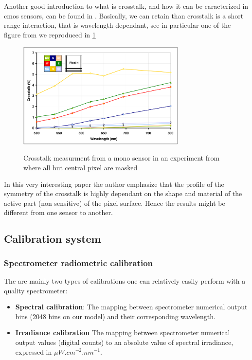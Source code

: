 \documentclass{article}
\begin{document}
     Another good introduction to what is crosstalk, and how it can be caracterized in cmos sensors, can be found in \cite{Estribeau_2005}. Basically, we can retain than crosstalk is a short range interaction, that is wavelength dependant, see in particular one of the figure from \cite{Estribeau_2005} we reproduced in \ref{fig:estribeau_crosstalk_1}
     \begin{figure}[H]
      \centering
      \includegraphics[width=0.75\textwidth]{../../figures/crosstalk_mono_ex1.png}\\
      \caption{Crosstalk measurment from a mono sensor in an experiment from \cite{Estribeau_2005} where all but central pixel are masked}
      \label{fig:estribeau_crosstalk_1}
     \end{figure}
     
     In this very interesting paper the author emphasize that the profile of the symmetry of the crosstalk is highly dependant on the shape and material of the active part (non sensitive) of the pixel surface. Hence the results might be different from one sensor to another.
  
     
    
  \subsection{Calibration system}
    \subsubsection{Spectrometer radiometric calibration}
    The are mainly two types of calibrations one can relatively easily perform with a quality spectrometer:
    \begin{itemize}
     \item \textbf{Spectral calibration}: The mapping between spectrometer numerical output bins (2048 bins on our model) and their corresponding wavelength. 
     \item \textbf{Irradiance calibration} The mapping between spectrometer numerical output values (digital counts) to an absolute value of spectral irradiance, expressed in $\mu W . cm^{-2} . nm^{-1}$.
    \end{itemize}
\end{document}

